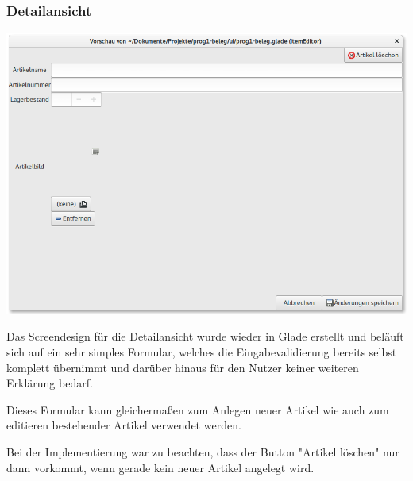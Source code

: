 \subsubsection{Detailansicht}
\begin{center}
\noindent\includegraphics[width=150mm,keepaspectratio]{images/07-detailansicht}
\end{center}

Das Screendesign für die Detailansicht wurde wieder in Glade erstellt und beläuft sich auf ein sehr simples
Formular, welches die Eingabevalidierung bereits selbst komplett übernimmt und darüber hinaus für den Nutzer
keiner weiteren Erklärung bedarf.

Dieses Formular kann gleichermaßen zum Anlegen neuer Artikel wie auch zum editieren bestehender Artikel verwendet
werden.

Bei der Implementierung war zu beachten, dass der Button "Artikel löschen" nur dann vorkommt, wenn gerade kein
neuer Artikel angelegt wird.
